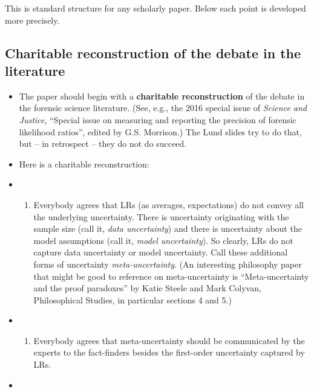 \documentclass[
  10pt,
  dvipsnames,enabledeprecatedfontcommands]{scrartcl}
\providecommand{\tightlist}{%
  \setlength{\itemsep}{0pt}\setlength{\parskip}{0pt}}
\begin{document}
This is standard structure for any scholarly paper. Below each point is
developed more precisely.

\hypertarget{charitable-reconstruction-of-the-debate-in-the-literature}{%
\subsection{Charitable reconstruction of the debate in the
literature}\label{charitable-reconstruction-of-the-debate-in-the-literature}}

\begin{itemize}
\item
  The paper should begin with a \textbf{charitable reconstruction} of
  the debate in the forensic science literature. (See, e.g., the 2016
  special issue of \emph{Science and Justice}, ``Special issue on
  measuring and reporting the precision of forensic likelihood ratios'',
  edited by G.S. Morrison.) The Lund slides try to do that, but -- in
  retrospect -- they do not do succeed.
\item
  Here is a charitable reconstruction:
\item
  \begin{enumerate}
  \def\labelenumi{(\roman{enumi})}
  \tightlist
  \item
    Everybody agrees that LRs (as averages, expectations) do not convey
    all the underlying uncertainty. There is uncertainty originating
    with the sample size (call it, \emph{data uncertainty}) and there is
    uncertainty about the model assumptions (call it, \emph{model
    uncertainty}). So clearly, LRs do not capture data uncertainty or
    model uncertainty. Call these additional forms of uncertainty
    \emph{meta-uncertainty}. (An interesting philosophy paper that might
    be good to reference on meta-uncertainty is ``Meta-uncertainty and
    the proof paradoxes'' by Katie Steele and Mark Colyvan,
    Philosophical Studies, in particular sections 4 and 5.)
  \end{enumerate}
\item
  \begin{enumerate}
  \def\labelenumi{(\roman{enumi})}
  \setcounter{enumi}{1}
  \tightlist
  \item
    Everybody agrees that meta-uncertainty should be communicated by the
    experts to the fact-finders besides the first-order uncertainty
    captured by LRs.
  \end{enumerate}
\item
  \begin{enumerate}

\end{enumerate}
\end{itemize}
\end{document}
